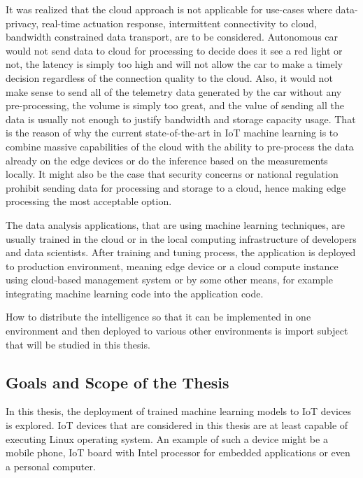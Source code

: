 \documentclass[english, 12pt, a4paper, elec, utf8, online]{aaltothesis}
\begin{document}
It was realized that the cloud approach is not applicable for use-cases where data-privacy, real-time actuation response, intermittent connectivity to cloud, bandwidth constrained data transport, are to be considered. Autonomous car would not send data to cloud for processing to decide does it see a red light or not, the latency is simply too high and will not allow the car to make a timely decision regardless of the connection quality to the cloud. Also, it would not  make sense to send all of the telemetry data generated by the car without any pre-processing, the volume is simply too great, and the value of sending all the data is usually not enough to justify bandwidth and storage capacity usage. That is the reason of why the current state-of-the-art in IoT machine learning is to combine massive capabilities of the cloud with the ability to pre-process the data already on the edge devices or do the inference based on the measurements locally.  It might also be the case that security concerns or national regulation prohibit sending data for processing and storage to a cloud, hence making edge processing the most acceptable option.~\cite{stolpe2016internet} 

The data analysis applications, that are using machine learning techniques, are usually trained in the cloud or in the local computing infrastructure of developers and data scientists. After training and tuning process, the application is deployed to production environment, meaning edge device or a cloud compute instance using cloud-based management system or by some other means, for example integrating machine learning code into the application code. %

How to distribute the intelligence so that it can be implemented in one environment and then deployed to various other environments is import subject that will be studied in this thesis.

\subsection{Goals and Scope of the Thesis}
In this thesis, the deployment of trained machine learning models to IoT devices is explored. IoT devices that are considered in this thesis are at least capable of executing Linux operating system. An example of such a device might be a mobile phone, IoT board with Intel processor for embedded applications or even a personal computer.
\end{document}
